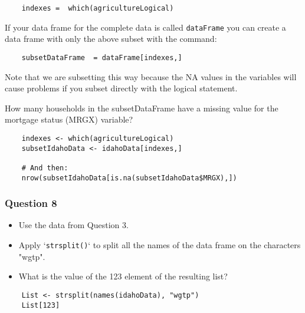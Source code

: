 \documentclass{beamer}
\begin{document}
\begin{frame}[fragile]
	
\begin{framed} 
\begin{verbatim}
	indexes =  which(agricultureLogical) 
\end{verbatim}
\end{framed} 

If your data frame for the complete data is called \texttt{dataFrame} you can create a data frame 
with only the above subset with the command: 

\end{frame}
\begin{frame}[fragile]
	
\begin{framed} 
	\begin{verbatim}
	subsetDataFrame  = dataFrame[indexes,] 
	\end{verbatim}
\end{framed} 

\noindent Note that we are subsetting this way because the NA values in the variables 
will cause problems if you subset directly with the logical statement. 

\end{frame}
\begin{frame}[fragile]
	
\noindent How many households in the subsetDataFrame have a missing value for the mortgage status 
(MRGX) variable?

\begin{framed} 
	\begin{verbatim}
	indexes <- which(agricultureLogical)
	subsetIdahoData <- idahoData[indexes,]
	
	# And then:
	nrow(subsetIdahoData[is.na(subsetIdahoData$MRGX),])
	\end{verbatim}
\end{framed} 

\end{frame}
\begin{frame}[fragile]
	
\frametitle{Question 8}
\begin{itemize}
	\item Use the data from Question 3.
	\item Apply `\texttt{strsplit()}` to split all the names of the data frame on the characters "wgtp". 
	\item What is the value of the 123 element of the resulting list?
\end{itemize}

\begin{framed} \begin{verbatim}
	List <- strsplit(names(idahoData), "wgtp")
	List[123]
	\end{verbatim}\end{framed} 

\end{frame}
\end{document}
